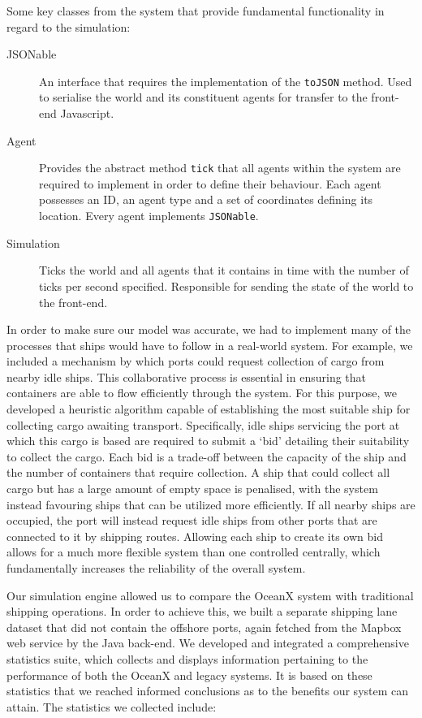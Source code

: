 Some key classes from the system that provide fundamental functionality in regard to the simulation:

\begin{description}
	\item[JSONable] An interface that requires the implementation of the \texttt{toJSON} method. Used to serialise the world and its constituent agents for transfer to the front-end Javascript.
	\item[Agent] Provides the abstract method \lstinline{tick} that all agents within the system are required to implement in order to define their behaviour. Each agent possesses an ID, an agent type and a set of coordinates defining its location. Every agent implements \lstinline{JSONable}.
	\item[Simulation] Ticks the world and all agents that it contains in time with the number of ticks per second specified. Responsible for sending the state of the world to the front-end.
\end{description}

In order to make sure our model was accurate, we had to implement many of the processes that ships would have to follow in a real-world system. For example, we included a mechanism by which ports could request collection of cargo from nearby idle ships. This collaborative process is essential in ensuring that containers are able to flow efficiently through the system. For this purpose, we developed a heuristic algorithm capable of establishing the most suitable ship for collecting cargo awaiting transport. Specifically, idle ships servicing the port at which this cargo is based are required to submit a `bid’ detailing their suitability to collect the cargo. Each bid is a trade-off between the capacity of the ship and the number of containers that require collection. A ship that could collect all cargo but has a large amount of empty space is penalised, with the system instead favouring ships that can be utilized more efficiently. If all nearby ships are occupied, the port will instead request idle ships from other ports that are connected to it by shipping routes. Allowing each ship to create its own bid allows for a much more flexible system than one controlled centrally, which fundamentally increases the reliability of the overall system.

Our simulation engine allowed us to compare the OceanX system with traditional shipping operations. In order to achieve this, we built a separate shipping lane dataset that did not contain the offshore ports, again fetched from the Mapbox web service by the Java back-end. We developed and integrated a comprehensive statistics suite, which collects and displays information pertaining to the performance of both the OceanX and legacy systems. It is based on these statistics that we reached informed conclusions as to the benefits our system can attain. The statistics we collected include:


